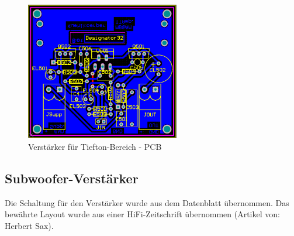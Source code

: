 \begin{figure} [H]
	\centering	
	\includegraphics[width=0.6\textwidth]{img/Print5/5_TTVerstaerker-PCB.PNG}
	\caption{Verstärker für Tiefton-Bereich - PCB}
	\label {fig:5.2.3.1}
\end{figure}


\newpage
\subsection{Subwoofer-Verstärker}
Die Schaltung für den Verstärker wurde aus dem Datenblatt übernommen. %
Das bewährte Layout wurde aus einer HiFi-Zeitschrift übernommen (Artikel von: Herbert Sax).
